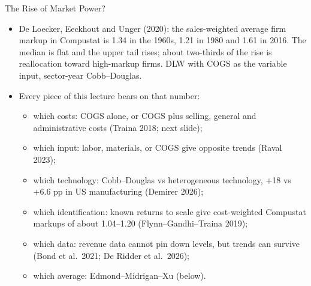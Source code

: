 \documentclass[aspectratio=169,10pt]{beamer}
\begin{document}
\begin{frame}{The Rise of Market Power?}
\begin{itemize}
\item De Loecker, Eeckhout and Unger (2020): the sales-weighted average firm markup in Compustat is 1.34 in the 1960s, 1.21 in 1980 and 1.61 in 2016. The median is flat and the upper tail rises; about two-thirds of the rise is reallocation toward high-markup firms. DLW with COGS as the variable input, sector-year Cobb--Douglas.
\item Every piece of this lecture bears on that number:
\begin{itemize}
\item \alert{which costs}: COGS alone, or COGS plus selling, general and administrative costs (Traina 2018; next slide);
\item \alert{which input}: labor, materials, or COGS give opposite trends (Raval 2023);
\item \alert{which technology}: Cobb--Douglas vs heterogeneous technology, +18 vs +6.6 pp in US manufacturing (Demirer 2026);
\item \alert{which identification}: known returns to scale give cost-weighted Compustat markups of about 1.04--1.20 (Flynn--Gandhi--Traina 2019);
\item \alert{which data}: revenue data cannot pin down levels, but trends can survive (Bond et al.\ 2021; De Ridder et al.\ 2026);
\item \alert{which average}: Edmond--Midrigan--Xu (below).
\end{itemize}
\end{itemize}
\end{frame}
\end{document}
